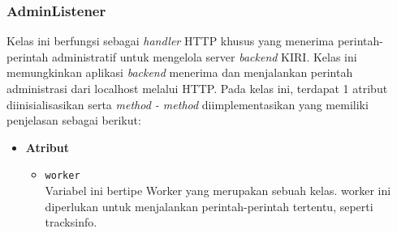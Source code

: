 \subsubsection{AdminListener}
Kelas ini berfungsi sebagai \textit{handler} HTTP khusus yang menerima perintah-perintah administratif untuk mengelola server \textit{backend} KIRI. Kelas ini memungkinkan aplikasi \textit{backend} menerima dan menjalankan perintah administrasi dari localhost melalui HTTP. Pada kelas ini, terdapat 1 atribut diinisialisasikan serta \textit{method - method} diimplementasikan yang memiliki penjelasan sebagai berikut:
\begin{itemize}
    \item \textbf{Atribut}
    \begin{itemize}
        \item \texttt{worker}
        \\ Variabel ini bertipe Worker yang merupakan sebuah kelas. worker ini diperlukan untuk menjalankan perintah-perintah tertentu, seperti tracksinfo.
    \end{itemize}
    

\end{itemize}
